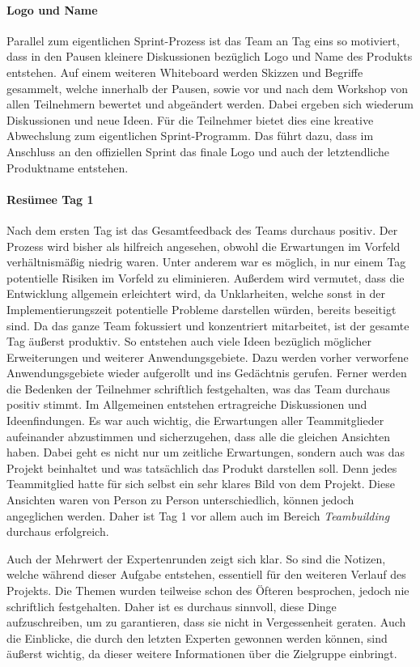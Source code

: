 \paragraph{Logo und Name}
Parallel zum eigentlichen Sprint-Prozess ist das Team an Tag eins so motiviert, dass in den Pausen kleinere Diskussionen bezüglich Logo und Name des Produkts entstehen. Auf einem weiteren Whiteboard werden Skizzen und Begriffe gesammelt, welche innerhalb der Pausen, sowie vor und nach dem Workshop von allen Teilnehmern bewertet und abgeändert werden. Dabei ergeben sich wiederum Diskussionen und neue Ideen. Für die Teilnehmer bietet dies eine kreative Abwechslung zum eigentlichen Sprint-Programm. Das führt dazu, dass im Anschluss an den offiziellen Sprint das finale Logo und auch der letztendliche Produktname entstehen.

\paragraph{Resümee Tag 1}
Nach dem ersten Tag ist das Gesamtfeedback des Teams durchaus positiv. Der Prozess wird bisher als hilfreich angesehen, obwohl die Erwartungen im Vorfeld verhältnismäßig niedrig waren. Unter anderem war es möglich, in nur einem Tag potentielle Risiken im Vorfeld zu eliminieren. Außerdem wird vermutet, dass die Entwicklung allgemein erleichtert wird, da Unklarheiten, welche sonst in der Implementierungszeit potentielle Probleme darstellen würden, bereits beseitigt sind. Da das ganze Team fokussiert und konzentriert mitarbeitet, ist der gesamte Tag äußerst produktiv. So entstehen auch viele Ideen bezüglich möglicher Erweiterungen und weiterer Anwendungsgebiete. Dazu werden vorher verworfene Anwendungsgebiete wieder aufgerollt und ins Gedächtnis gerufen. Ferner werden die Bedenken der Teilnehmer schriftlich festgehalten, was das Team durchaus positiv stimmt. Im Allgemeinen entstehen ertragreiche Diskussionen und Ideenfindungen. Es war auch wichtig, die Erwartungen aller Teammitglieder aufeinander abzustimmen und sicherzugehen, dass alle die gleichen Ansichten haben. Dabei geht es nicht nur um zeitliche Erwartungen, sondern auch was das Projekt beinhaltet und was tatsächlich das Produkt darstellen soll. Denn jedes Teammitglied hatte für sich selbst ein sehr klares Bild von dem Projekt. Diese Ansichten waren von Person zu Person unterschiedlich, können jedoch angeglichen werden. Daher ist Tag 1 vor allem auch im Bereich \textit{Teambuilding} durchaus erfolgreich.

Auch der Mehrwert der Expertenrunden zeigt sich klar. So sind die Notizen, welche während dieser Aufgabe entstehen, essentiell für den weiteren Verlauf des Projekts. Die Themen wurden teilweise schon des Öfteren besprochen, jedoch nie schriftlich festgehalten. Daher ist es durchaus sinnvoll, diese Dinge aufzuschreiben, um zu garantieren, dass sie nicht in Vergessenheit geraten. Auch die Einblicke, die durch den letzten Experten gewonnen werden können, sind äußerst wichtig, da dieser weitere Informationen über die Zielgruppe einbringt.

